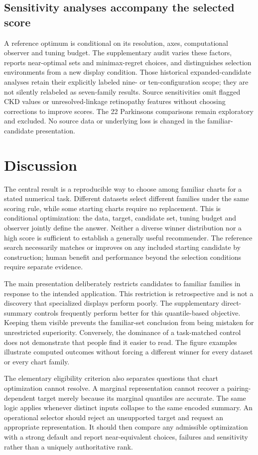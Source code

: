 \documentclass[11pt]{article}
\begin{document}
\subsection*{Sensitivity analyses accompany the selected score}
A reference optimum is conditional on its resolution, axes, computational observer and tuning budget. The supplementary audit varies these factors, reports near-optimal sets and minimax-regret choices, and distinguishes selection environments from a new display condition. Those historical expanded-candidate analyses retain their explicitly labeled nine- or ten-configuration scope; they are not silently relabeled as seven-family results. Source sensitivities omit flagged CKD values or unresolved-linkage retinopathy features without choosing corrections to improve scores. The 22 Parkinsons comparisons remain exploratory and excluded. No source data or underlying loss is changed in the familiar-candidate presentation.

\section*{Discussion}
The central result is a reproducible way to choose among familiar charts for a stated numerical task. Different datasets select different families under the same scoring rule, while some starting charts require no replacement. This is conditional optimization: the data, target, candidate set, tuning budget and observer jointly define the answer. Neither a diverse winner distribution nor a high score is sufficient to establish a generally useful recommender. The reference search necessarily matches or improves on any included starting candidate by construction; human benefit and performance beyond the selection conditions require separate evidence.

The main presentation deliberately restricts candidates to familiar families in response to the intended application. This restriction is retrospective and is not a discovery that specialized displays perform poorly. The supplementary direct-summary controls frequently perform better for this quantile-based objective. Keeping them visible prevents the familiar-set conclusion from being mistaken for unrestricted superiority. Conversely, the dominance of a task-matched control does not demonstrate that people find it easier to read. The figure examples illustrate computed outcomes without forcing a different winner for every dataset or every chart family.

The elementary eligibility criterion also separates questions that chart optimization cannot resolve. A marginal representation cannot recover a pairing-dependent target merely because its marginal quantiles are accurate. The same logic applies whenever distinct inputs collapse to the same encoded summary. An operational selector should reject an unsupported target and request an appropriate representation. It should then compare any admissible optimization with a strong default and report near-equivalent choices, failures and sensitivity rather than a uniquely authoritative rank.
\end{document}
